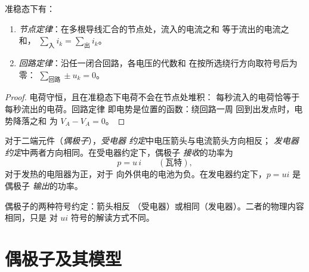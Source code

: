 \begin{theorem}[基尔霍夫定律]\label{thm:b1:dc-circuits:kirchhoff}
准稳态下有：
\begin{enumerate}
  \item \emph{节点定律}：在多根导线汇合的节点处，流入的电流之和
        等于流出的电流之和，
        $\sum_{\text{入}} i_k = \sum_{\text{出}} i_k$。
  \item \emph{回路定律}：沿任一闭合回路，各电压的代数和
        在按所选绕行方向取符号后为零：
        $\sum_{\text{回路}} \pm u_k = 0$。
\end{enumerate}
\end{theorem}

\begin{proof}
电荷守恒，且在准稳态下电荷不会在节点处堆积：
每秒流入的电荷恰等于每秒流出的电荷。回路定律
即电势是位置的函数：绕回路一周
回到出发点时，电势降落之和
为 $V_A - V_A = 0$。
\end{proof}

\begin{notation}[约定与功率]\label{not:b1:dc-circuits:conventions}
对于二端元件（\emph{偶极子}），\emph{受电器
约定}中电压箭头与电流箭头方向相反；
\emph{发电器约定}中两者方向相同。在受电器约定下，偶极子
\emph{接收}的功率为
%
\[
p = u\,i \qquad (\text{瓦特}),
\]
对于发热的电阻器为正，对于
向外供电的电池为负。在发电器约定下，$p = ui$ 是偶极子
\emph{输出}的功率。
\end{notation}

\begin{omfigure}

{\small 偶极子的两种符号约定：箭头相反
（受电器）或相同（发电器）。二者的物理内容相同，只是
对 $ui$ 符号的解读方式不同。}
\end{omfigure}

\section{偶极子及其模型}

